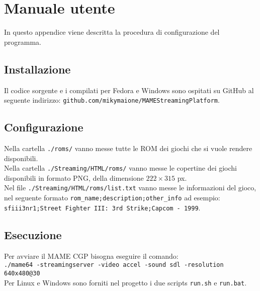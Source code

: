 \chapter{Manuale utente}
In questo appendice viene descritta la procedura di configurazione del programma.

\section{Installazione}
Il codice sorgente e i compilati per Fedora e Windows sono ospitati su GitHub al seguente indirizzo: \verb|github.com/mikymaione/MAMEStreamingPlatform|.

\section{Configurazione}
Nella cartella \verb|./roms/| vanno messe tutte le ROM dei giochi che si vuole rendere disponibili.\\
Nella cartella \verb|./Streaming/HTML/roms/| vanno messe le copertine dei giochi disponibili in formato PNG, della dimensione $222 \times 315$ px.\\
Nel file \verb|./Streaming/HTML/roms/list.txt| vanno messe le informazioni del gioco, nel seguente formato \verb|rom_name;description;other_info| ad esempio:\\ \verb|sfiii3nr1;Street Fighter III: 3rd Strike;Capcom - 1999|.

\section{Esecuzione} \label{sec:chapMU_Esecuzione}
Per avviare il MAME CGP bisogna eseguire il comando:\\
\verb|./mame64 -streamingserver -video accel -sound sdl -resolution 640x480@30|\\
Per Linux e Windows sono forniti nel progetto i due scripts \verb|run.sh| e \verb|run.bat|.